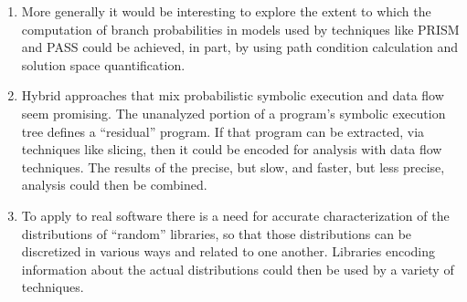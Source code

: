 \begin{enumerate}
\item More generally it would be interesting to explore the extent
to which the computation of branch probabilities
in models used by techniques like PRISM and PASS could be achieved,
in part, by using path condition calculation and solution
space quantification.

\item Hybrid approaches that mix probabilistic symbolic execution
and data flow seem promising.  The unanalyzed portion of a program's
symbolic execution tree defines a ``residual'' program.  If that
program can be extracted, via techniques like slicing, then it
could be encoded for analysis with data flow techniques.  The
results of the precise, but slow, and faster, but less precise,
analysis could then be combined. 

\item To apply to real software there is a need for accurate characterization
of the distributions of ``random'' libraries, so that those distributions 
can be discretized in various ways and related to one another.  Libraries
encoding information about the actual distributions could then be used
by a variety of techniques.

\end{enumerate}
